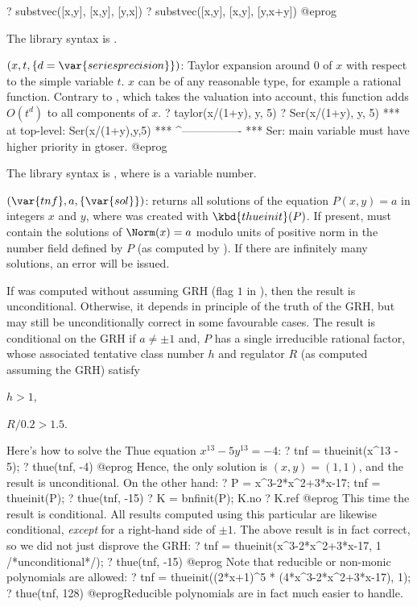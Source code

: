 \bprog
? substvec([x,y], [x,y], [y,x])
? substvec([x,y], [x,y], [y,x+y])
@eprog

The library syntax is .

$(x,t,\{d=\var{seriesprecision}\})$: \label{se:taylor}Taylor expansion around $0$ of $x$ with respect to
the simple variable $t$. $x$ can be of any reasonable type, for example a
rational function. Contrary to , which takes the valuation into
account, this function adds $O(t^d)$ to all components of $x$.
\bprog
? taylor(x/(1+y), y, 5)
? Ser(x/(1+y), y, 5)
 ***   at top-level: Ser(x/(1+y),y,5)
 ***                 ^----------------
 *** Ser: main variable must have higher priority in gtoser.
@eprog

The library syntax is , where  is a variable number.

$(\var{tnf},a,\{\var{sol}\})$: \label{se:thue}returns all solutions of the equation
$P(x,y)=a$ in integers $x$ and $y$, where  was created with
$\kbd{thueinit}(P)$. If present,  must contain the solutions of
$\Norm(x)=a$ modulo units of positive norm in the number field
defined by $P$ (as computed by ). If there are infinitely
many solutions, an error will be issued.

If  was computed without assuming GRH (flag $1$ in ),
then the result is unconditional. Otherwise, it depends in principle of the
truth of the GRH, but may still be unconditionally correct in some
favourable cases. The result is conditional on the GRH if
$a\neq \pm 1$ and, $P$ has a single irreducible rational factor, whose
associated tentative class number $h$ and regulator $R$ (as computed
assuming the GRH) satisfy

\item $h > 1$,

\item $R/0.2 > 1.5$.

Here's how to solve the Thue equation $x^{13} - 5y^{13} = - 4$:
\bprog
? tnf = thueinit(x^13 - 5);
? thue(tnf, -4)
@eprog
Hence, the only solution is $(x,y) = (1,1)$, and the result is
unconditional. On the other hand:
\bprog
? P = x^3-2*x^2+3*x-17; tnf = thueinit(P);
? thue(tnf, -15)
? K = bnfinit(P); K.no
? K.ref
@eprog
This time the result is conditional. All results computed using this
particular  are likewise conditional, \emph{except} for a right-hand
side of $\pm 1$.
The above result is in fact correct, so we did not just disprove the GRH:
\bprog
? tnf = thueinit(x^3-2*x^2+3*x-17, 1 /*unconditional*/);
? thue(tnf, -15)
@eprog
Note that reducible or non-monic polynomials are allowed:
\bprog
? tnf = thueinit((2*x+1)^5 * (4*x^3-2*x^2+3*x-17), 1);
? thue(tnf, 128)
@eprog\noindent Reducible polynomials are in fact much easier to handle.

